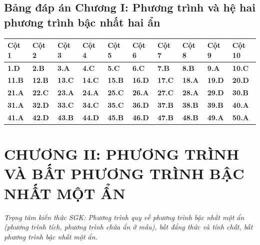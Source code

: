 \documentclass[11pt,a4paper]{article}
\begin{document}
\subsection*{\color{primary} Bảng đáp án Chương I: Phương trình và hệ hai phương trình bậc nhất hai ẩn}
\begin{center}
\renewcommand{\arraystretch}{1.25}
\begin{tabularx}{\textwidth}{*{10}{>{\centering\arraybackslash}X}}
\toprule
\textbf{\color{primary} Cột 1} & \textbf{\color{primary} Cột 2} & \textbf{\color{primary} Cột 3} & \textbf{\color{primary} Cột 4} & \textbf{\color{primary} Cột 5} & \textbf{\color{primary} Cột 6} & \textbf{\color{primary} Cột 7} & \textbf{\color{primary} Cột 8} & \textbf{\color{primary} Cột 9} & \textbf{\color{primary} Cột 10} \\
\midrule
\textbf{1.D} & \textbf{2.B} & \textbf{3.A} & \textbf{4.C} & \textbf{5.C} & \textbf{6.C} & \textbf{7.B} & \textbf{8.B} & \textbf{9.A} & \textbf{10.C} \\
\rowcolor{rowtint} \textbf{11.B} & \textbf{12.B} & \textbf{13.C} & \textbf{14.C} & \textbf{15.B} & \textbf{16.D} & \textbf{17.C} & \textbf{18.A} & \textbf{19.D} & \textbf{20.D} \\
\textbf{21.A} & \textbf{22.C} & \textbf{23.A} & \textbf{24.A} & \textbf{25.C} & \textbf{26.A} & \textbf{27.C} & \textbf{28.A} & \textbf{29.D} & \textbf{30.B} \\
\rowcolor{rowtint} \textbf{31.A} & \textbf{32.D} & \textbf{33.C} & \textbf{34.C} & \textbf{35.C} & \textbf{36.D} & \textbf{37.B} & \textbf{38.B} & \textbf{39.B} & \textbf{40.A} \\
\textbf{41.A} & \textbf{42.D} & \textbf{43.B} & \textbf{44.D} & \textbf{45.B} & \textbf{46.D} & \textbf{47.B} & \textbf{48.B} & \textbf{49.A} & \textbf{50.A} \\
\bottomrule
\end{tabularx}
\end{center}\vspace{10pt}
\section*{\color{primary} CHƯƠNG II: PHƯƠNG TRÌNH VÀ BẤT PHƯƠNG TRÌNH BẬC NHẤT MỘT ẨN}
\textit{Trọng tâm kiến thức SGK: Phương trình quy về phương trình bậc nhất một ẩn (phương trình tích, phương trình chứa ẩn ở mẫu), bất đẳng thức và tính chất, bất phương trình bậc nhất một ẩn.}\par\vspace{4pt}
\end{document}
